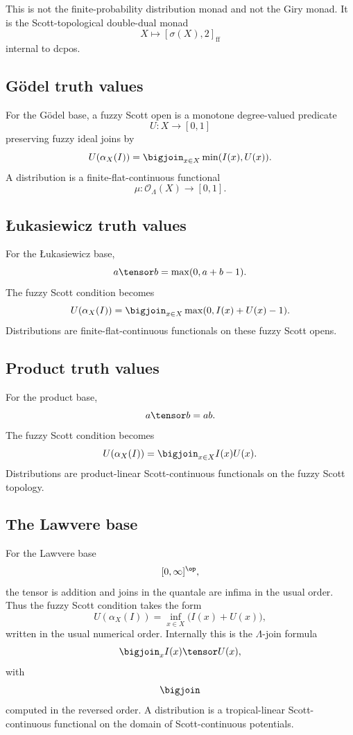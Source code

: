 This is not the finite-probability distribution monad and not the Giry monad.
It is the Scott-topological double-dual monad
\[
    X\longmapsto[\sigma(X),2]_{\mathrm{ff}}
\]
internal to dcpos.

\subsection{G\"odel truth values}
\label{subsec:godel-distribution-example}

For the G\"odel base, a fuzzy Scott open is a monotone degree-valued predicate
\[
    U:X\to[0,1]
\]
preserving fuzzy ideal joins by
\[
    U(\alpha_X(I))
    =
    \bigjoin_{x\in X}\min(I(x),U(x)).
\]
A distribution is a finite-flat-continuous functional
\[
    \mu:\mathcal O_{\Lambda}(X)\to[0,1].
\]

\subsection{\L ukasiewicz truth values}
\label{subsec:lukasiewicz-distribution-example}

For the \L ukasiewicz base,
\[
    a\tensor b=\max(0,a+b-1).
\]
The fuzzy Scott condition becomes
\[
    U(\alpha_X(I))
    =
    \bigjoin_{x\in X}
    \max(0,I(x)+U(x)-1).
\]
Distributions are finite-flat-continuous functionals on these fuzzy Scott
opens.

\subsection{Product truth values}
\label{subsec:product-distribution-example}

For the product base,
\[
    a\tensor b=ab.
\]
The fuzzy Scott condition becomes
\[
    U(\alpha_X(I))
    =
    \bigjoin_{x\in X}
    I(x)U(x).
\]
Distributions are product-linear Scott-continuous functionals on the fuzzy
Scott topology.

\subsection{The Lawvere base}
\label{subsec:lawvere-distribution-example}

For the Lawvere base
\[
    [0,\infty]^{\op},
\]
the tensor is addition and joins in the quantale are infima in the usual order.
Thus the fuzzy Scott condition takes the form
\[
    U(\alpha_X(I))
    =
    \inf_{x\in X}
    \bigl(I(x)+U(x)\bigr),
\]
written in the usual numerical order.  Internally this is the
\(\Lambda\)-join formula
\[
    \bigjoin_x I(x)\tensor U(x),
\]
with
\[
    \bigjoin
\]
computed in the reversed order.  A distribution is a tropical-linear
Scott-continuous functional on the domain of Scott-continuous potentials.

